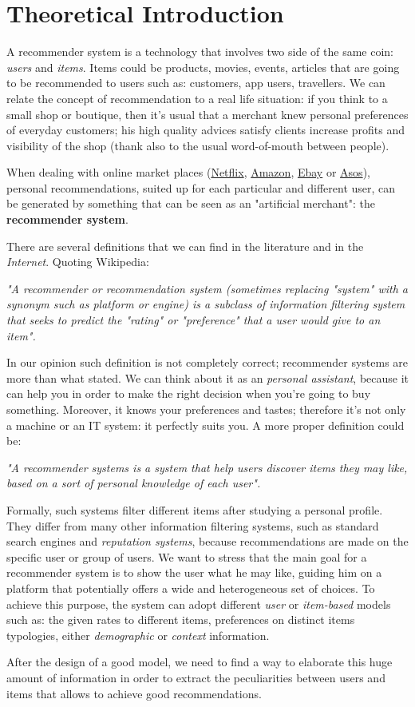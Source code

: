 \section{Theoretical Introduction}

A recommender system is a technology that involves two side of the same coin: \textit{users} and \textit{items}. Items could be products, movies, events, articles that are going to be recommended to users such as: customers, app users, travellers. We can relate the concept of recommendation to a real life situation: if you think to a small shop or boutique, then it's usual that a merchant knew personal preferences of everyday customers; his high quality advices satisfy clients increase profits and visibility of the shop (thank also to the usual word-of-mouth between people).

When dealing with online market places (\href{https://www.netflix.com/}{Netflix}, \href{https://www.amazon.com/}{Amazon}, \href{https://www.ebay.com/}{Ebay} or \href{http://www.asos.com/}{Asos}), personal recommendations, suited up for each particular and different user, can be generated by something that can be seen as an "artificial merchant": the \textbf{recommender system}.

There are several definitions that we can find in the literature and in the \textit{Internet}. Quoting Wikipedia: 

\textit{"A recommender or recommendation system (sometimes replacing "system" with a synonym such as platform or engine) is a subclass of information filtering system that seeks to predict the "rating" or "preference" that a user would give to an item".}

In our opinion such definition is not completely correct; recommender systems are more than what stated. We can think about it as an \textit{personal assistant}, because it can help you in order to make the right decision when you're going to buy something. Moreover, it knows your preferences and tastes; therefore it's not only a machine or an IT system: it perfectly suits you. A more proper definition could be: 

\textit{"A recommender systems is a system that help users discover items they may like, based on a sort of personal knowledge of each user".}

Formally, such systems filter different items after studying a personal profile. They differ from many other information filtering systems, such as standard search engines and \textit{reputation systems}, because recommendations are made on the specific user or group of users. 
We want to stress that the main goal for a recommender system is to show the user what he may like, guiding him on a platform that potentially offers a wide and heterogeneous set of choices. To achieve this purpose, the system can adopt different \textit{user} or \textit{item-based}  models such as: the given rates to different items, preferences on distinct items typologies, either \textit{demographic} or \textit{context} information. 

After the design of a good model, we need to find a way to elaborate this huge amount of information in order to extract the peculiarities between users and items that allows to achieve good recommendations. 

